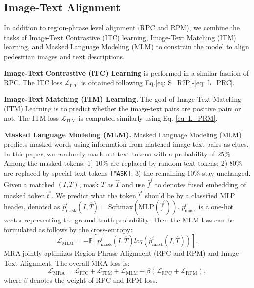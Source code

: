 


\subsection{Image-Text Alignment}
\noindent In addition to region-phrase level alignment (RPC and RPM), we combine the tasks of Image-Text Contrastive (ITC) learning, Image-Text Matching (ITM) learning, and Masked Language Modeling (MLM) to constrain the model to align pedestrian images and text descriptions.


\noindent\textbf{Image-Text Contrastive (ITC) Learning} is performed in a similar fashion of RPC. The ITC loss $\mathcal{L}_{\text{ITC}}$ is obtained following Eq.\ref{eq: S_R2P}-\ref{eq: L_PRC}.


\noindent\textbf{Image-Text Matching (ITM) Learning.}
The goal of Image-Text Matching (ITM) Learning is to predict whether the image-text pairs are positive pairs or not.
The ITM loss $\mathcal{L}_{\text{ITM}}$ is computed similarly using Eq. \ref{eq: L_PRM}.







\noindent\textbf{Masked Language Modeling (MLM).}
Masked Language Modeling (MLM) predicts masked words using information from matched image-text pairs as clues. 
In this paper, we randomly mask out text tokens with a probability of $25\%$. 
Among the masked tokens: 
1) $10\%$ are replaced by random text tokens; 
2) $80\%$ are replaced by special text tokens \texttt{[MASK]}; 
3) the remaining $10\%$ stay unchanged.
Given a matched $(I, T)$, mask $T$ as $\hat{T}$ and use $\hat{f}^i$ to denotes fused embedding of masked token $\hat{t}^i$.
We predict what the token $\hat{t}^i$ should be by a classified MLP header, denoted as $\hat{p}_{\text{mask}}^i(I, \hat{T}) = \text{Softmax}(\text{MLP}(\hat{f}^i))$.
$p_{\text{mask}}^i$ is a one-hot vector representing the ground-truth probability. Then the MLM loss can be formulated as follows by the cross-entropy:
\begin{equation}
\label{eq: L_MLM}
\mathcal{L}_{\text{MLM}} = -\mathbb{E}[p_{\text{mask}}^i(I, \hat{T}) log( \hat{p}_{\text{mask}}^i(I, \hat{T}))].
\end{equation}
MRA jointly optimizes Region-Phrase Alignment (RPC and RPM) and Image-Text Alignment. 
The overall MRA loss is:
\begin{equation}
\label{eq: L_MRA}
\mathcal{L}_{\text{MRA}} = \mathcal{L}_{\text{ITC}} + \mathcal{L}_{\text{ITM}} +\mathcal{L}_{\text{MLM}} + \beta (\mathcal{L}_{\text{RPC}} + \mathcal{L}_{\text{RPM}}),
\end{equation}
\noindent where $\beta$ denotes the weight of RPC and RPM loss.


